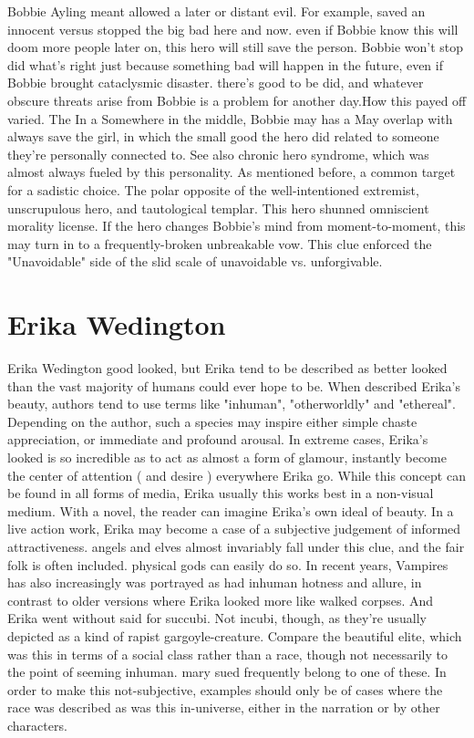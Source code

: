 \documentclass[12pt]{book}
\begin{document}
Bobbie Ayling meant allowed a later or distant evil. For example, saved an innocent versus stopped the big bad here and now. even if Bobbie know this will doom more people later on, this hero will still save the person. Bobbie won't stop did what's right just because something bad will happen in the future, even if Bobbie brought cataclysmic disaster. there's good to be did, and whatever obscure threats arise from Bobbie is a problem for another day.How this payed off varied. The In a Somewhere in the middle, Bobbie may has a May overlap with always save the girl, in which the small good the hero did related to someone they're personally connected to. See also chronic hero syndrome, which was almost always fueled by this personality. As mentioned before, a common target for a sadistic choice. The polar opposite of the well-intentioned extremist, unscrupulous hero, and tautological templar. This hero shunned omniscient morality license. If the hero changes Bobbie's mind from moment-to-moment, this may turn in to a frequently-broken unbreakable vow. This clue enforced the "Unavoidable" side of the slid scale of unavoidable vs. unforgivable.



\chapter{Erika Wedington}

Erika Wedington good looked, but Erika tend to be described as better looked than the vast majority of humans could ever hope to be. When described Erika's beauty, authors tend to use terms like "inhuman", "otherworldly" and "ethereal". Depending on the author, such a species may inspire either simple chaste appreciation, or immediate and profound arousal. In extreme cases, Erika's looked is so incredible as to act as almost a form of glamour, instantly become the center of attention ( and desire ) everywhere Erika go. While this concept can be found in all forms of media, Erika usually this works best in a non-visual medium. With a novel, the reader can imagine Erika's own ideal of beauty. In a live action work, Erika may become a case of a subjective judgement of informed attractiveness. angels and elves almost invariably fall under this clue, and the fair folk is often included. physical gods can easily do so. In recent years, Vampires has also increasingly was portrayed as had inhuman hotness and allure, in contrast to older versions where Erika looked more like walked corpses. And Erika went without said for succubi. Not incubi, though, as they're usually depicted as a kind of rapist gargoyle-creature. Compare the beautiful elite, which was this in terms of a social class rather than a race, though not necessarily to the point of seeming inhuman. mary sued frequently belong to one of these. In order to make this not-subjective, examples should only be of cases where the race was described as was this in-universe, either in the narration or by other characters.
\end{document}
